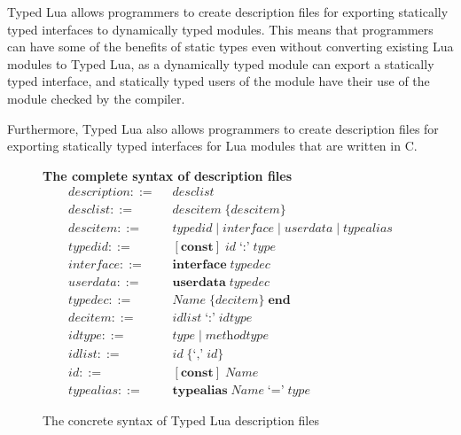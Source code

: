 Typed Lua allows programmers to create description files
for exporting statically typed interfaces to dynamically typed modules.
This means that programmers can have some of the benefits of
static types even without converting existing Lua modules to Typed Lua,
as a dynamically typed module can export a statically typed interface,
and statically typed users of the module have their use of the module
checked by the compiler.

Furthermore, Typed Lua also allows programmers to create description
files for exporting statically typed interfaces for Lua modules
that are written in C.

\begin{figure}[!ht]
\textbf{The complete syntax of description files}\\
\dstart
\begin{align*}
\textit{description} ::= & \;\; \textit{desclist}\\
\textit{desclist} ::= & \;\; \textit{descitem} \; \{ \textit{descitem} \}\\
\textit{descitem} ::= & \;\; \textit{typedid} \; | \;
  \textit{interface} \; | \;
  \textit{userdata} \; | \;
  \textit{typealias}\\
\textit{typedid} ::= & \;\; [\textbf{const}] \; \textit{id} \; \texttt{`:'} \; \textit{type}\\ 
\textit{interface} ::= & \;\; \textbf{interface} \; \textit{typedec}\\
\textit{userdata} ::= & \;\; \textbf{userdata} \; \textit{typedec}\\
\textit{typedec} ::= & \;\; \textit{Name} \; \{\textit{decitem}\} \; \textbf{end}\\
\textit{decitem} ::= & \;\; \textit{idlist} \; \texttt{`:'} \; \textit{idtype}\\
\textit{idtype} ::= & \;\; \textit{type} \; | \; \textit{methodtype}\\
\textit{idlist} ::= & \;\; \textit{id} \; \{\texttt{`,'} \; \textit{id}\}\\
\textit{id} ::= & \;\; [\textbf{const}] \; \textit{Name}\\
\textit{typealias} ::= & \;\; \textbf{typealias} \; \textit{Name} \; \texttt{`='} \; \textit{type}
\end{align*}
\dend
\caption{The concrete syntax of Typed Lua description files}
\label{fig:tldsyntax}
\end{figure}

